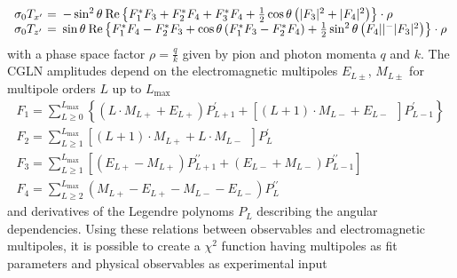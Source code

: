 \documentclass[a4paper,10pt]{article}
\def\cc{^*}
\def\Re{\mathrm{Re}}
\begin{document}
\begin{displaymath}
\begin{array}{lcl}
\sigma_0 T_{x^\prime} &\hspace{-0.67em}=&\hspace{-0.5em} -\sin^2\theta\:\Re \left\lbrace F_1\cc F_3 + F_2\cc F_4 + F_3\cc F_4
                            +\frac{1}{2}\cos\theta\left(|F_3|^2 + |F_4|^2\right) \right\rbrace \cdot \rho\\
\sigma_0 T_{z^\prime} &\hspace{-0.67em}=&\hspace{-0.5em} \sin\theta\:\Re \left\lbrace F_1\cc F_4 - F_2\cc F_3
                            + \cos\theta\left(F_1\cc F_3 - F_2\cc F_4\right)
                            +\frac{1}{2}\sin^2\theta\left(F_4||^ - |F_3|^2\right)\right\rbrace \cdot \rho\\
\end{array}
\end{displaymath}
with a phase space factor $\rho = \frac{q}{k}$ given by pion and photon momenta $q$ and $k$. The CGLN amplitudes
depend on the electromagnetic multipoles $E_{L\pm}$, $M_{L\pm}$ for multipole orders $L$ up to $L_\mathrm{max}$
\begin{displaymath}\label{frm_CGLN}
\begin{array}{l}
F_1 = \sum\limits_{L\geq 0}^{L_\mathrm{max}} \left\lbrace (L\cdot M_{L+} + E_{L+})P^{\prime}_{L+1} 
+ \left[(L+1)\cdot M_{L-} + E_{L-}\phantom{{}^{\prime}_{L}}\right]P^{\prime}_{L-1} \right\rbrace\\
F_2 = \sum\limits_{L\geq 1}^{L_\mathrm{max}} \left[(L+1)\cdot M_{L+} + L\cdot M_{L-} \phantom{{}^{\prime}_{L}}  \right]P^{\prime}_{L}\\
F_3 = \sum\limits_{L\geq 1}^{L_\mathrm{max}} \left[(E_{L+} - M_{L+})P^{\prime\prime}_{L+1}+ (E_{L-} + M_{L-})P^{\prime\prime}_{L-1} \right]\\
F_4 = \sum\limits_{L\geq 2}^{L_\mathrm{max}}\left( M_{L+} - E_{L+} - M_{L-} - E_{L-}\right)P^{\prime\prime}_{L}
\end{array}
\end{displaymath}
and derivatives of the Legendre polynoms $P_L$ describing the angular dependencies. Using these relations between observables
and electromagnetic multipoles, it is possible to create a $\chi^2$ function having multipoles as fit parameters and physical
observables as experimental input
\end{document}
